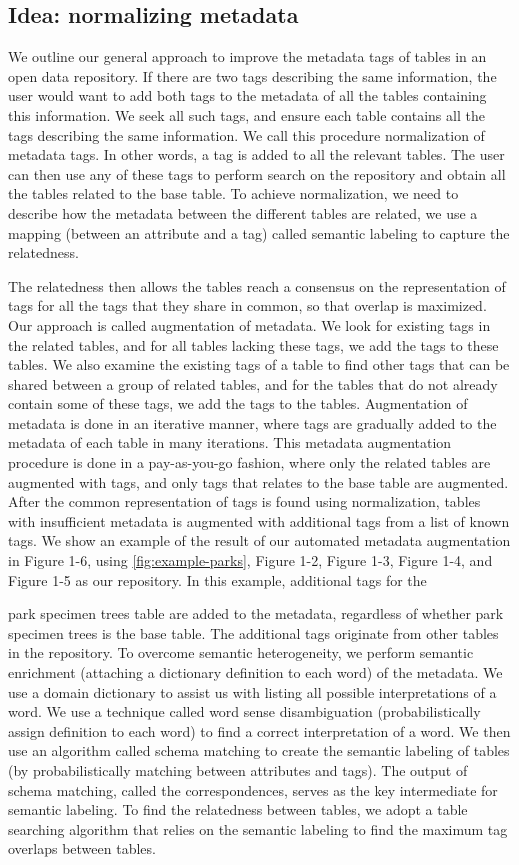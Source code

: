 \subsection{Idea: normalizing metadata}
We outline our general approach to improve the metadata tags of tables in an open data repository. If there are two tags describing the same information, the user would want to add both tags to the metadata of all the tables containing this information. We seek all such tags, and ensure each table contains all the tags describing the same information. We call this procedure normalization of metadata tags. In other words, a tag is added to all the relevant tables.
The user can then use any of these tags to perform search on the repository and obtain all the tables related to the base table. To achieve normalization, we need to describe how the metadata between the different tables are related, we use a mapping (between an attribute and a tag) called semantic labeling to capture the relatedness.


The relatedness then allows the tables reach a consensus on the representation of tags for all the tags that they share in common, so that overlap is maximized. Our approach is called augmentation of metadata. We look for existing tags in the related tables, and for all tables lacking these tags, we add the tags to these tables. We also examine the existing tags of a table to find other tags that can be shared between a group of related tables, and for the tables that do not already contain some of these tags, we add the tags to the tables. Augmentation of metadata is done in an iterative manner, where tags are gradually added to the metadata of each table in many iterations. This metadata augmentation procedure is done in a pay-as-you-go fashion, where only the related tables are augmented with tags, and only tags that relates to the base table are augmented.
After the common representation of tags is found using normalization, tables with insufficient metadata is augmented with additional tags from a list of known tags. We show an example of the result of our automated metadata augmentation in Figure 1-6, using \autoref{fig:example-parks}, Figure 1-2, Figure 1-3, Figure 1-4, and Figure 1-5 as our repository. In this example, additional tags for the

park specimen trees table are added to the metadata, regardless of whether park specimen trees is the base table. The additional tags originate from other tables in the repository.
To overcome semantic heterogeneity, we perform semantic enrichment (attaching a dictionary definition to each word) of the metadata. We use a domain dictionary to assist us with listing all possible interpretations of a word. We use a technique called word sense disambiguation (probabilistically assign definition to each word) to find a correct interpretation of a word. We then use an algorithm called schema matching to create the semantic labeling of tables (by probabilistically matching between attributes and tags). The output of schema matching, called the correspondences, serves as the key intermediate for semantic labeling. To find the relatedness between tables, we adopt a table searching algorithm that relies on the semantic labeling to find the maximum tag overlaps between tables.

